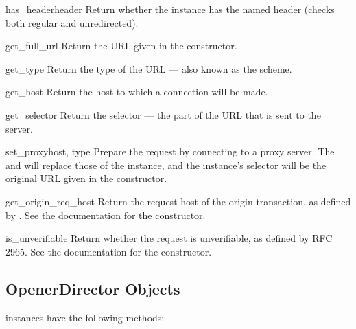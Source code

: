 \begin{methoddesc}[Request]{has_header}{header}
Return whether the instance has the named header (checks both regular
and unredirected).
\end{methoddesc}

\begin{methoddesc}[Request]{get_full_url}{}
Return the URL given in the constructor.
\end{methoddesc}

\begin{methoddesc}[Request]{get_type}{}
Return the type of the URL --- also known as the scheme.
\end{methoddesc}

\begin{methoddesc}[Request]{get_host}{}
Return the host to which a connection will be made.
\end{methoddesc}

\begin{methoddesc}[Request]{get_selector}{}
Return the selector --- the part of the URL that is sent to
the server.
\end{methoddesc}

\begin{methoddesc}[Request]{set_proxy}{host, type}
Prepare the request by connecting to a proxy server. The 
and  will replace those of the instance, and the instance's
selector will be the original URL given in the constructor.
\end{methoddesc}

\begin{methoddesc}[Request]{get_origin_req_host}{}
Return the request-host of the origin transaction, as defined by
.  See the documentation for the 
constructor.
\end{methoddesc}

\begin{methoddesc}[Request]{is_unverifiable}{}
Return whether the request is unverifiable, as defined by RFC 2965.
See the documentation for the  constructor.
\end{methoddesc}


\subsection{OpenerDirector Objects \label{opener-director-objects}}

 instances have the following methods:

